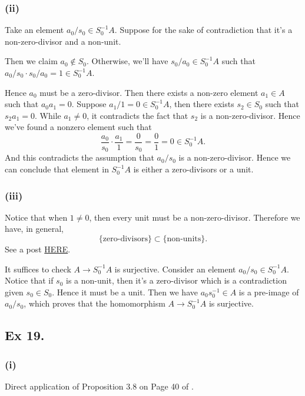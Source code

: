 \subsubsection{(ii)}

Take an element $a_0/s_0\in S_0^{-1}A$. Suppose for the sake of contradiction that it's a non-zero-divisor and a non-unit. 

Then we claim $a_0\notin S_0$. Otherwise, we'll have $s_0/a_0\in S_0^{-1}A$ such that $a_0/s_0\cdot s_0/a_0=1\in S_0^{-1}A$. 

Hence $a_0$ must be a zero-divisor. Then there exists a non-zero element $a_1\in A$ such that $a_0a_1=0$. Suppose $a_1/1=0\in S_0^{-1}A$, then there exists $s_2\in S_0$ such that $s_2a_1=0$. While $a_1\neq 0$, it contradicts the fact that $s_2$ is a non-zero-divisor. Hence we've found a nonzero element such that 
\[\frac{a_0}{s_0}\cdot \frac{a_1}{1}=\frac{0}{s_0}=\frac{0}{1}=0\in S_0^{-1}A.\]
And this contradicts the assumption that $a_0/s_0$ is a non-zero-divisor. Hence we can conclude that element in $S_0^{-1}A$ is either a zero-divisors or a unit.

\subsubsection{(iii)} %

Notice that when $1\neq 0$, then every unit must be a non-zero-divisor. Therefore we have, in general, \[\{\text{zero-divisors}\}\subset\{\text{non-units}\}.\]
See a post \href{https://math.stackexchange.com/questions/2062615/can-an-element-in-a-ring-with-unity-be-both-a-unit-and-zero-divisor}{HERE}.

It suffices to check $A\to S_0^{-1}A$ is surjective. Consider an element $a_0/s_0\in S_0^{-1}A$. Notice that if $s_0$ is a non-unit, then it's a zero-divisor which is a contradiction given $s_0\in S_0$. Hence it must be a unit. Then we have $a_0s_0^{-1}\in A$ is a pre-image of $a_0/s_0$, which proves that the homomorphism $A\to S_0^{-1}A$ is surjective. 

\subsection{Ex 19.}

\subsubsection{(i)} 
Direct application of Proposition 3.8 on Page 40 of \cite{atiyah1994introduction}. 